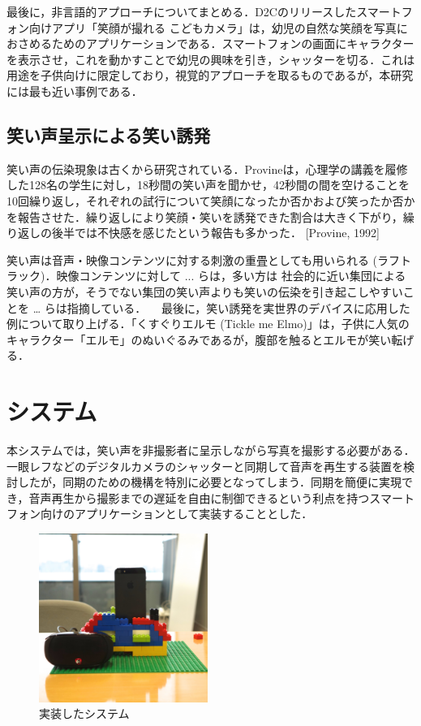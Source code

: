 \documentclass[submit,techreq]{ec2014}
\begin{document}
最後に，非言語的アプローチについてまとめる．D2Cのリリースしたスマートフォン向けアプリ「笑顔が撮れる こどもカメラ」は，幼児の自然な笑顔を写真におさめるためのアプリケーションである．スマートフォンの画面にキャラクターを表示させ，これを動かすことで幼児の興味を引き，シャッターを切る．これは用途を子供向けに限定しており，視覚的アプローチを取るものであるが，本研究には最も近い事例である．


\subsection{笑い声呈示による笑い誘発}

笑い声の伝染現象は古くから研究されている．Provineは，心理学の講義を履修した128名の学生に対し，18秒間の笑い声を聞かせ，42秒間の間を空けることを10回繰り返し，それぞれの試行について笑顔になったか否かおよび笑ったか否かを報告させた．繰り返しにより笑顔・笑いを誘発できた割合は大きく下がり，繰り返しの後半では不快感を感じたという報告も多かった． [Provine, 1992] 

笑い声は音声・映像コンテンツに対する刺激の重畳としても用いられる (ラフトラック)．映像コンテンツに対して ... らは，多い方は 社会的に近い集団による笑い声の方が，そうでない集団の笑い声よりも笑いの伝染を引き起こしやすいことを … らは指摘している．
　最後に，笑い誘発を実世界のデバイスに応用した例について取り上げる．「くすぐりエルモ (Tickle me Elmo)」は，子供に人気のキャラクター「エルモ」のぬいぐるみであるが，腹部を触るとエルモが笑い転げる．

\section{システム}

本システムでは，笑い声を非撮影者に呈示しながら写真を撮影する必要がある．一眼レフなどのデジタルカメラのシャッターと同期して音声を再生する装置を検討したが，同期のための機構を特別に必要となってしまう．同期を簡便に実現でき，音声再生から撮影までの遅延を自由に制御できるという利点を持つスマートフォン向けのアプリケーションとして実装することとした．

\begin{figure}[h!]
  \centering  
\includegraphics[width=55mm, bb=0 0 2404 2404]{images/system.jpg}
\caption{実装したシステム}
  \label{recursive}
\end{figure}
\end{document}
